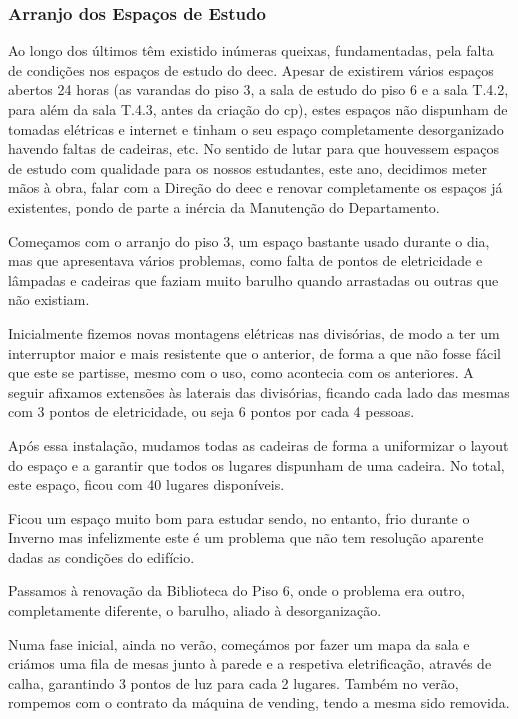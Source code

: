 
\subsubsection{Arranjo dos Espaços de Estudo}

Ao longo dos últimos têm existido inúmeras queixas, fundamentadas, pela falta de condições nos espaços de estudo do \acrshort{deec}. Apesar de existirem vários espaços abertos 24 horas (as varandas do piso 3, a sala de estudo do piso 6 e a sala T.4.2, para além da sala T.4.3, antes da criação do \acrlong{cp}), estes espaços não dispunham de tomadas elétricas e internet e tinham o seu espaço completamente desorganizado havendo faltas de cadeiras, etc. No sentido de lutar para que houvessem espaços de estudo com qualidade para os nossos estudantes, este ano, decidimos meter mãos à obra, falar com a Direção do \acrshort{deec} e renovar completamente os espaços já existentes, pondo de parte a inércia da Manutenção do Departamento.

Começamos com o arranjo do piso 3, um espaço bastante usado durante o dia, mas que apresentava vários problemas, como falta de pontos de eletricidade e lâmpadas e cadeiras que faziam muito barulho quando arrastadas ou outras que não existiam.

Inicialmente fizemos novas montagens elétricas nas divisórias, de modo a ter um interruptor maior e mais resistente que o anterior, de forma a que não fosse fácil que este se partisse, mesmo com o uso, como acontecia com os anteriores. A seguir afixamos extensões às laterais das divisórias, ficando cada lado das mesmas com 3 pontos de eletricidade, ou seja 6 pontos por cada 4 pessoas.

Após essa instalação, mudamos todas as cadeiras de forma a uniformizar o layout do espaço e a garantir que todos os lugares dispunham de uma cadeira. No total, este espaço, ficou com 40 lugares disponíveis.

Ficou um espaço muito bom para estudar sendo, no entanto, frio durante o Inverno mas infelizmente este é um problema que não tem resolução aparente dadas as condições do edifício.

Passamos à renovação da Biblioteca do Piso 6, onde o problema era outro, completamente diferente, o barulho, aliado à desorganização.

Numa fase inicial, ainda no verão, começámos por fazer um mapa da sala e criámos uma fila de mesas junto à parede e a respetiva eletrificação, através de calha, garantindo 3 pontos de luz para cada 2 lugares. Também no verão, rompemos com o contrato da máquina de vending, tendo a mesma sido removida.

